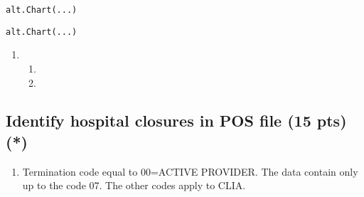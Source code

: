 \documentclass[
  letterpaper,
  DIV=11,
  numbers=noendperiod]{scrartcl}
\providecommand{\tightlist}{%
  \setlength{\itemsep}{0pt}\setlength{\parskip}{0pt}}\usepackage{longtable,booktabs,array}
\begin{document}
\begin{verbatim}
alt.Chart(...)
\end{verbatim}

\begin{verbatim}
alt.Chart(...)
\end{verbatim}

\begin{enumerate}
\def\labelenumi{\arabic{enumi}.}
\setcounter{enumi}{3}
\tightlist
\item
  \begin{enumerate}
  \def\labelenumii{\alph{enumii}.}
  \tightlist
  \item
  \item
  \end{enumerate}
\end{enumerate}

\subsection{Identify hospital closures in POS file (15 pts)
(*)}\label{identify-hospital-closures-in-pos-file-15-pts}

\begin{enumerate}
\def\labelenumi{\arabic{enumi}.}
\tightlist
\item
  Termination code equal to 00=ACTIVE PROVIDER. The data contain only up
  to the code 07. The other codes apply to CLIA.
\end{enumerate}
\end{document}
